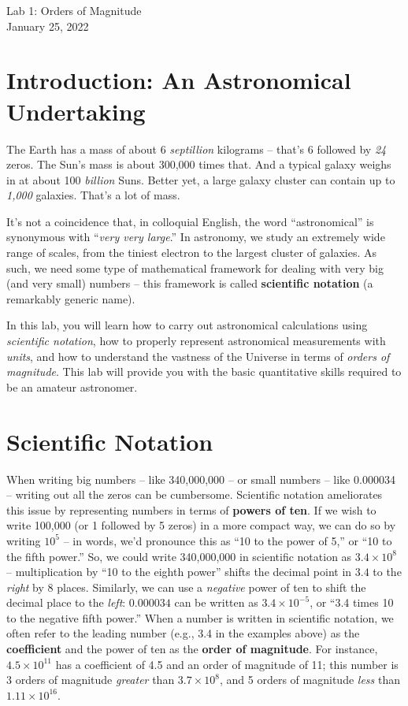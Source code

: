 \documentclass[11pt]{article}
\begin{document}
\begin{center}
\huge{Lab 1: Orders of Magnitude}\\ \medskip \Large{January 25, 2022}
\end{center}


\section{Introduction: An Astronomical Undertaking}

The Earth has a mass of about 6 \emph{septillion} kilograms -- that's 6 followed by \emph{24} zeros. The Sun's mass is about 300,000 times that. And a typical galaxy weighs in at about 100 \emph{billion} Suns. Better yet, a large galaxy cluster can contain up to \emph{1,000} galaxies. That's a lot of mass.

It's not a coincidence that, in colloquial English, the word ``astronomical'' is synonymous with ``\emph{very very large}.'' In astronomy, we study an extremely wide range of scales, from the tiniest electron to the largest cluster of galaxies. As such, we need some type of mathematical framework for dealing with very big (and very small) numbers -- this framework is called \textbf{scientific notation} (a remarkably generic name). 

In this lab, you will learn how to carry out astronomical calculations using \emph{scientific notation}, how to properly represent astronomical measurements with \emph{units}, and how to understand the vastness of the Universe in terms of \emph{orders of magnitude}. This lab will provide you with the basic quantitative skills required to be an amateur astronomer.

\bigskip

\section{Scientific Notation}
When writing big numbers -- like 340,000,000 -- or small numbers -- like 0.000034 -- writing out all the zeros can be cumbersome. Scientific notation ameliorates this issue by representing numbers in terms of \textbf{powers of ten}. If we wish to write 100,000 (or 1 followed by 5 zeros) in a more compact way, we can do so by writing $10^5$ -- in words, we'd pronounce this as ``10 to the power of 5,'' or ``10 to the fifth power.'' So, we could write 340,000,000 in scientific notation as $3.4 \times 10^8$ -- multiplication by ``10 to the eighth power'' shifts the decimal point in $3.4$ to the \emph{right} by 8 places. Similarly, we can use a \emph{negative} power of ten to shift the decimal place to the \emph{left}: $0.000034$ can be written as $3.4 \times 10^{-5}$, or ``3.4 times 10 to the negative fifth power.'' When a number is written in scientific notation, we often refer to the leading number (e.g., 3.4 in the examples above) as the \textbf{coefficient} and the power of ten as the \textbf{order of magnitude}. For instance, $4.5 \times 10^{11}$ has a coefficient of 4.5 and an order of magnitude of 11; this number is 3 orders of magnitude \emph{greater} than $3.7 \times 10^8$, and 5 orders of magnitude \emph{less} than $1.11 \times 10^{16}$.
\end{document}
